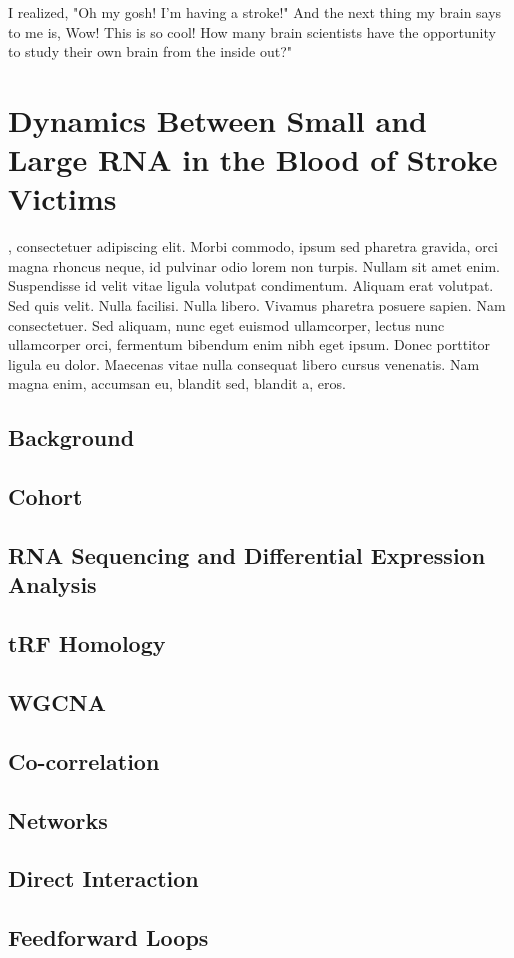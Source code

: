 \begin{savequote}[75mm]
I realized, "Oh my gosh! I'm having a stroke!" And the next thing my brain says to me is, Wow! This is so cool! How many brain scientists have the opportunity to study their own brain from the inside out?"
\end{savequote}

\chapter{Dynamics Between Small and Large RNA in the Blood of Stroke Victims}

, consectetuer adipiscing elit. Morbi commodo, ipsum sed pharetra gravida, orci magna rhoncus neque, id pulvinar odio lorem non turpis. Nullam sit amet enim. Suspendisse id velit vitae ligula volutpat condimentum. Aliquam erat volutpat. Sed quis velit. Nulla facilisi. Nulla libero. Vivamus pharetra posuere sapien. Nam consectetuer. Sed aliquam, nunc eget euismod ullamcorper, lectus nunc ullamcorper orci, fermentum bibendum enim nibh eget ipsum. Donec porttitor ligula eu dolor. Maecenas vitae nulla consequat libero cursus venenatis. Nam magna enim, accumsan eu, blandit sed, blandit a, eros.

\section{Background}
\section{Cohort}
\section{RNA Sequencing and Differential Expression Analysis}
\section{tRF Homology}
\section{WGCNA}
\section{Co-correlation}
\section{Networks}
\section{Direct Interaction}
\section{Feedforward Loops} \label{stroke:ffl}

